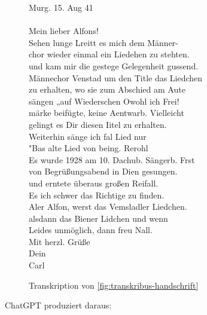 \documentclass[12pt, a4paper, ngerman, bidi=default]{article}
\begin{document}
  \begin{figure}[htbp]
  \centering
  \begin{tcolorbox}[colback=oldLetter, colframe=black, sharp corners, width=\textwidth]
    Murg. 15. Aug 41 \\
    \\
    Mein lieber Alfons! \\
    Sehen lunge Lreitt es mich dem Männer- \\
    chor wieder einmal ein Liedehen zu stehten. \\
    und kam mir die gestege Gelegenheit gussend. \\
    Männechor Venstad um den Title das Liedchen \\
    zu erhalten, wo sie zum Abschied am Aute \\
    sängen „auf Wiederschen Owohl ich Frei! \\
    märke beifügte, keine Aentwarb. Vielleicht \\
    gelingt es Dir diesen Iitel zu erhalten. \\
    Weiterhin sänge ich fal Lied nur \\
    "Bas alte Lied von being. Rerohl \\
    Es wurde 1928 am 10. Dachub. Sängerb. Frst \\
    von Begrüßungsabend in Dien gesungen. \\
    und erntete überaus großen Reifall. \\
    Es ich schwer das Richtige zu finden. \\
    Aler Alfon, werst das Vemsladler Liedchen. \\
    alsdann das Biener Lidchen und wenn \\
    Leides unmöglich, dann freu Nall. \\
    Mit herzl. Grüße \\
    Dein \\
    Carl \\
  \end{tcolorbox}
  \caption{Transkription von \autoref{fig:transkribus-handschrift}}
  \label{fig:transkription-brief}
\end{figure}

    ChatGPT produziert daraus:
\end{document}
